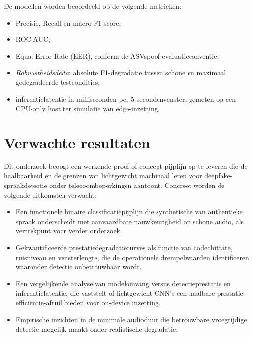 \documentclass{hogent-article}
\begin{document}
De modellen worden beoordeeld op de volgende metrieken:

\begin{itemize}
  \item Precisie, Recall en macro-F1-score;
  \item ROC-AUC;
  \item Equal Error Rate (EER), conform de ASVspoof-evaluatieconventie;
  \item \emph{Robuustheidsdelta}: absolute F1-degradatie tussen schone en
    maximaal gedegradeerde testcondities;
  \item inferentielatentie in milliseconden per 5-secondenvenster, gemeten op
    een CPU-only host ter simulatie van edge-inzetting.
\end{itemize}

\section{Verwachte resultaten}%
\label{sec:verwachte-resultaten}

Dit onderzoek beoogt een werkende proof-of-concept-pijplijn op te leveren die de
haalbaarheid en de grenzen van lichtgewicht machinaal leren voor deepfake-spraak\-detectie
onder telecoombeperkingen aantoont. Concreet worden de volgende uitkomsten
verwacht:

\begin{itemize}
  \item Een functionele binaire classificatiepijplijn die synthetische van
    authentieke spraak onderscheidt met aanvaardbare nauwkeurigheid op schone
    audio, als vertrekpunt voor verder onderzoek.
  \item Gekwantificeerde prestatiedegradatiecurves als functie van codecbitrate,
    ruisniveau en vensterlengte, die de operationele drempelwaarden identificeren
    waaronder detectie onbetrouwbaar wordt.
  \item Een vergelijkende analyse van modelomvang versus detectieprestatie en
    inferentielatentie, die vaststelt of lichtgewicht CNN's een haalbare
    prestatie-efficiëntie-afruil bieden voor on-device inzetting.
  \item Empirische inzichten in de minimale audioduur die betrouwbare
    vroegtijdige detectie mogelijk maakt onder realistische degradatie.
\end{itemize}
\end{document}
